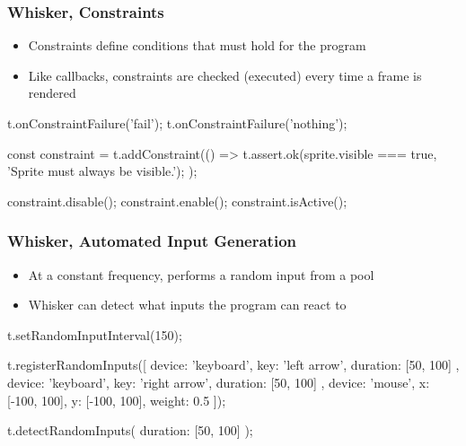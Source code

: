 \begin{frame}[fragile]\frametitle{Whisker, Constraints}
    \begin{itemize}
        \item Constraints \textcolor{upfim}{define conditions} that must hold for the program
        \item Like callbacks, constraints are checked (executed) every time a frame is rendered
    \end{itemize}

    \begin{javascriptcode}
        t.onConstraintFailure('fail');
        t.onConstraintFailure('nothing');

        const constraint = t.addConstraint(() => {
            t.assert.ok(sprite.visible === true,
                        'Sprite must always be visible.');
        });

        constraint.disable();
        constraint.enable();
        constraint.isActive();
    \end{javascriptcode}
\end{frame}

\begin{frame}[fragile]\frametitle{Whisker, Automated Input Generation}
    \begin{itemize}
        \item At a constant frequency, performs a random input from a pool
        \item Whisker can detect what inputs the program can react to
    \end{itemize}

    \begin{javascriptcode}
        t.setRandomInputInterval(150);

        t.registerRandomInputs([
          { device: 'keyboard', key: 'left arrow', duration: [50, 100] },
          { device: 'keyboard', key: 'right arrow', duration: [50, 100] },
          { device: 'mouse', x: [-100, 100], y: [-100, 100], weight: 0.5 }
        ]);

        t.detectRandomInputs({ duration: [50, 100] });
    \end{javascriptcode}
\end{frame}

\newcommand{\tablebox}[1]{
    \begin{tikzpicture}
         \node[draw, text width=7.5cm, minimum height=0.6cm, rounded corners] {\footnotesize #1};
    \end{tikzpicture}
}

